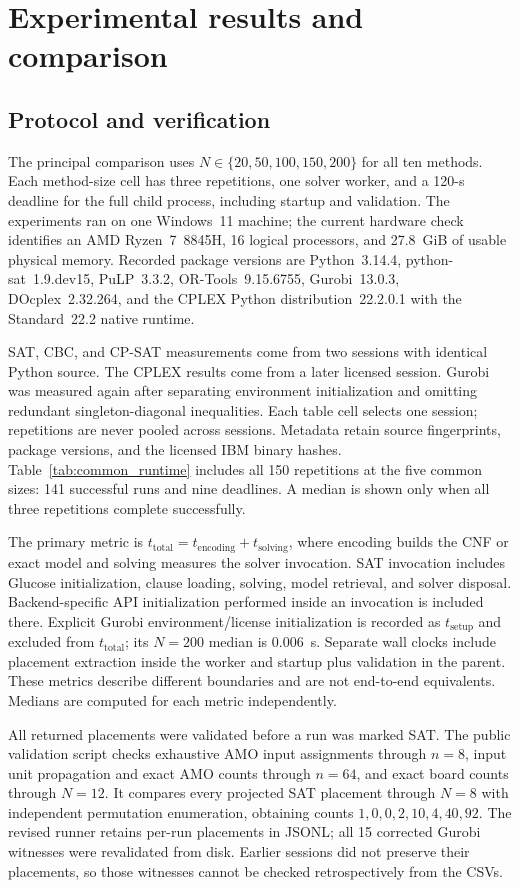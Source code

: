\documentclass[a4paper,fleqn]{cas-sc}
\begin{document}
\section{Experimental results and comparison}

\subsection{Protocol and verification}
The principal comparison uses $N\in\{20,50,100,150,200\}$ for all ten methods. Each method-size cell has three repetitions, one solver worker, and a 120-s deadline for the full child process, including startup and validation. The experiments ran on one Windows~11 machine; the current hardware check identifies an AMD Ryzen~7~8845H, 16 logical processors, and 27.8~GiB of usable physical memory. Recorded package versions are Python~3.14.4, python-sat~1.9.dev15, PuLP~3.3.2, OR-Tools~9.15.6755, Gurobi~13.0.3, DOcplex~2.32.264, and the CPLEX Python distribution~22.2.0.1 with the Standard~22.2 native runtime.

SAT, CBC, and CP-SAT measurements come from two sessions with identical Python source. The CPLEX results come from a later licensed session. Gurobi was measured again after separating environment initialization and omitting redundant singleton-diagonal inequalities. Each table cell selects one session; repetitions are never pooled across sessions. Metadata retain source fingerprints, package versions, and the licensed IBM binary hashes. Table~\ref{tab:common_runtime} includes all 150 repetitions at the five common sizes: 141 successful runs and nine deadlines. A median is shown only when all three repetitions complete successfully.

The primary metric is $t_{\mathrm{total}}=t_{\mathrm{encoding}}+t_{\mathrm{solving}}$, where encoding builds the CNF or exact model and solving measures the solver invocation. SAT invocation includes Glucose initialization, clause loading, solving, model retrieval, and solver disposal. Backend-specific API initialization performed inside an invocation is included there. Explicit Gurobi environment/license initialization is recorded as $t_{\mathrm{setup}}$ and excluded from $t_{\mathrm{total}}$; its $N=200$ median is 0.006~s. Separate wall clocks include placement extraction inside the worker and startup plus validation in the parent. These metrics describe different boundaries and are not end-to-end equivalents. Medians are computed for each metric independently.

All returned placements were validated before a run was marked SAT. The public validation script checks exhaustive AMO input assignments through $n=8$, input unit propagation and exact AMO counts through $n=64$, and exact board counts through $N=12$. It compares every projected SAT placement through $N=8$ with independent permutation enumeration, obtaining counts $1,0,0,2,10,4,40,92$. The revised runner retains per-run placements in JSONL; all 15 corrected Gurobi witnesses were revalidated from disk. Earlier sessions did not preserve their placements, so those witnesses cannot be checked retrospectively from the CSVs.
\end{document}
